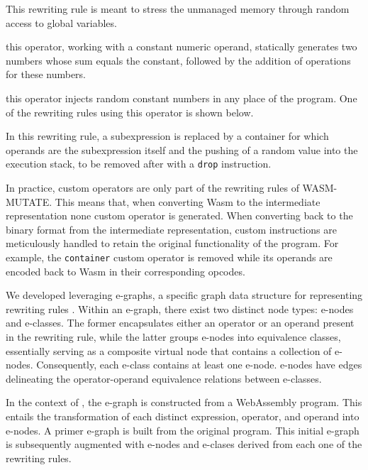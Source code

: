 

\noindent This rewriting rule is meant to stress the unmanaged memory through random access to global variables.

 this operator, working with a constant numeric operand, statically generates two numbers whose sum equals the constant, followed by the addition of operations for these numbers.



 this operator injects random constant numbers in any place of the program. One of the rewriting rules using this operator is shown below.



\noindent In this rewriting rule, a subexpression is replaced by a container for which operands are the subexpression itself and the pushing of a random value into the execution stack, to be removed after with a \texttt{drop} instruction.

In practice, custom operators are only part of the rewriting rules of WASM-MUTATE.
This means that, when converting Wasm to the intermediate representation none custom operator is generated.
When converting back to the \Wasm binary format from the intermediate representation, custom instructions are meticulously handled to retain the original functionality of the \Wasm program. 
For example, the \texttt{container} custom operator is removed while its operands are encoded back to Wasm in their corresponding opcodes.



\label{alg}

We developed \tool leveraging e-graphs, a specific graph data structure for representing rewriting rules \cite{10.1145/3571207}. 
Within an e-graph, there exist two distinct node types: e-nodes and e-classes. 
The former encapsulates either an operator or an operand present in the rewriting rule, while the latter groups e-nodes into equivalence classes, essentially serving as a composite virtual node that contains a collection of e-nodes. 
Consequently, each e-class contains at least one e-node.
e-nodes have edges delineating the operator-operand equivalence relations between e-classes.

In the context of \tool, the e-graph is constructed from a WebAssembly program.
This entails the transformation of each distinct expression, operator, and operand into e-nodes. 
A primer e-graph is built from the original program.
This initial e-graph is subsequently augmented with e-nodes and e-clases derived from each one of the rewriting rules.

